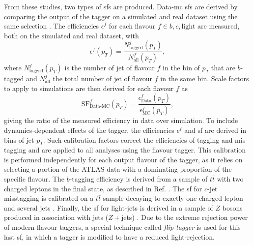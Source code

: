 From these studies, two types of \glspl{sf} are produced. Data-\gls{mc} \glspl{sf} are derived by comparing the output of the tagger on a simulated and real dataset using the same selection \cite{Aad:2019aic, ATLAS-CONF-2018-045, ATLAS-CONF-2018-006, cjettaggingCalib}. The efficiencies $\epsilon^f$ for each flavour $f \in {b, c, \textrm{light}}$ are measured, both on the simulated and real dataset, with \[\epsilon^f(p_T) = \frac{N^f_{\textrm{tagged}}(p_T)}{N^f_{\textrm{all}}(p_T)},\] where $N^f_{\textrm{tagged}}(p_T)$ is the number of jet of flavour $f$ in the bin of $p_T$ that are $b$-tagged and $N^f_{\textrm{all}}$ the total number of jet of flavour $f$ in the same bin. Scale factors to apply to simulations are then derived for each flavour $f$ as \[\textrm{SF}^f_{\textrm{Data-MC}}(p_T) = \frac{\epsilon^f_{\textrm{Data}}(p_T)}{\epsilon^f_{\textrm{MC}}(p_T)},\] giving the ratio of the measured efficiency in data over simulation. To include dynamics-dependent effects of the tagger, the efficiencies $\epsilon^f$ and \gls{sf} are derived in bins of jet $p_T$. Such calibration factors correct the efficiencies of tagging and mis-tagging and are applied to all analyses using the flavour tagger. This calibration is performed independently for each output flavour of the tagger, as it relies on selecting a portion of the ATLAS data with a dominating proportion of the specific flavour. The $b$-tagging efficiency is derived from a sample of $t\bar{t}$ with two charged leptons in the final state, as described in Ref. \cite{Aad:2019aic}. The \gls{sf} for $c$-jet misstagging is calibrated on a $t\bar{t}$ sample decaying to exactly one charged lepton and several jets \cite{cjettaggingCalib}. Finally, the \gls{sf} for light-jets is derived in a sample of $Z$ bosons produced in association with jets ($Z+$jets) \cite{ATLAS:2023lwk}. Due to the extreme rejection power of modern flavour taggers, a special technique called \textit{flip tagger} is used for this last \gls{sf}, in which a tagger is modified to have a reduced light-rejection.\\

